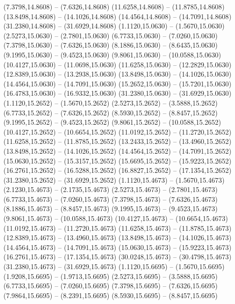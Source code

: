 {\begin{scope}[shift={(#1,#2)}]
    (7.3798,14.8608) -- (7.6326,14.8608)
    (11.6258,14.8608) -- (11.8785,14.8608)
    (13.8498,14.8608) -- (14.1026,14.8608)
    (14.4564,14.8608) -- (14.7091,14.8608)
    (31.2380,14.8608) -- (31.6929,14.8608)
    (1.1120,15.0630) -- (1.5670,15.0630)
    (2.5273,15.0630) -- (2.7801,15.0630)
    (6.7733,15.0630) -- (7.0260,15.0630)
    (7.3798,15.0630) -- (7.6326,15.0630)
    (8.1886,15.0630) -- (8.6435,15.0630)
    (9.1995,15.0630) -- (9.4523,15.0630)
    (9.8061,15.0630) -- (10.0588,15.0630)
    (10.4127,15.0630) -- (11.0698,15.0630)
    (11.6258,15.0630) -- (12.2829,15.0630)
    (12.8389,15.0630) -- (13.2938,15.0630)
    (13.8498,15.0630) -- (14.1026,15.0630)
    (14.4564,15.0630) -- (14.7091,15.0630)
    (15.2652,15.0630) -- (15.7201,15.0630)
    (16.4783,15.0630) -- (16.9332,15.0630)
    (31.2380,15.0630) -- (31.6929,15.0630)
    (1.1120,15.2652) -- (1.5670,15.2652)
    (2.5273,15.2652) -- (3.5888,15.2652)
    (6.7733,15.2652) -- (7.6326,15.2652)
    (8.5930,15.2652) -- (8.8457,15.2652)
    (9.1995,15.2652) -- (9.4523,15.2652)
    (9.8061,15.2652) -- (10.0588,15.2652)
    (10.4127,15.2652) -- (10.6654,15.2652)
    (11.0192,15.2652) -- (11.2720,15.2652)
    (11.6258,15.2652) -- (11.8785,15.2652)
    (13.2433,15.2652) -- (13.4960,15.2652)
    (13.8498,15.2652) -- (14.1026,15.2652)
    (14.4564,15.2652) -- (14.7091,15.2652)
    (15.0630,15.2652) -- (15.3157,15.2652)
    (15.6695,15.2652) -- (15.9223,15.2652)
    (16.2761,15.2652) -- (16.5288,15.2652)
    (16.8827,15.2652) -- (17.1354,15.2652)
    (31.2380,15.2652) -- (31.6929,15.2652)
    (1.1120,15.4673) -- (1.5670,15.4673)
    (2.1230,15.4673) -- (2.1735,15.4673)
    (2.5273,15.4673) -- (2.7801,15.4673)
    (6.7733,15.4673) -- (7.0260,15.4673)
    (7.3798,15.4673) -- (7.6326,15.4673)
    (8.1886,15.4673) -- (8.8457,15.4673)
    (9.1995,15.4673) -- (9.4523,15.4673)
    (9.8061,15.4673) -- (10.0588,15.4673)
    (10.4127,15.4673) -- (10.6654,15.4673)
    (11.0192,15.4673) -- (11.2720,15.4673)
    (11.6258,15.4673) -- (11.8785,15.4673)
    (12.8389,15.4673) -- (13.4960,15.4673)
    (13.8498,15.4673) -- (14.1026,15.4673)
    (14.4564,15.4673) -- (14.7091,15.4673)
    (15.0630,15.4673) -- (15.9223,15.4673)
    (16.2761,15.4673) -- (17.1354,15.4673)
    (30.0248,15.4673) -- (30.4798,15.4673)
    (31.2380,15.4673) -- (31.6929,15.4673)
    (1.1120,15.6695) -- (1.5670,15.6695)
    (1.9208,15.6695) -- (1.9713,15.6695)
    (2.5273,15.6695) -- (3.5888,15.6695)
    (6.7733,15.6695) -- (7.0260,15.6695)
    (7.3798,15.6695) -- (7.6326,15.6695)
    (7.9864,15.6695) -- (8.2391,15.6695)
    (8.5930,15.6695) -- (8.8457,15.6695)

\end{scope}}
